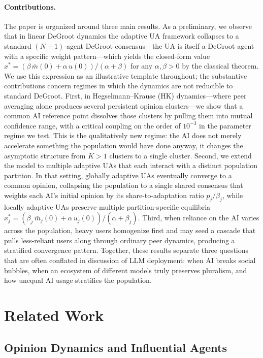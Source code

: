 \documentclass{article}
\theoremstyle{plain}
\theoremstyle{definition}
\theoremstyle{remark}
\newcommand{\mbar}{\bar{m}}
\begin{document}
\paragraph{Contributions.}
The paper is organized around three main results.  As a preliminary,
we observe that in linear DeGroot dynamics the adaptive UA framework
collapses to a standard $(N+1)$-agent DeGroot consensus---the UA is
itself a DeGroot agent with a specific weight pattern---which yields
the closed-form value
$x^*=(\beta\,\mbar(0)+\alpha\,u(0))/(\alpha+\beta)$ for any
$\alpha,\beta>0$ by the classical theorem.  We use this expression as
an illustrative template throughout; the substantive contributions
concern regimes in which the dynamics are not reducible to standard
DeGroot.
First, in Hegselmann--Krause (HK) dynamics---where peer averaging
alone produces several persistent opinion clusters---we show that a
common AI reference point dissolves those clusters by pulling them
into mutual confidence range, with a critical coupling on the order
of $10^{-3}$ in the parameter regime we test.  This is the
qualitatively new regime: the AI does not merely accelerate something
the population would have done anyway, it changes the asymptotic
structure from $K>1$ clusters to a single cluster.
Second, we extend the model to multiple adaptive UAs that each
interact with a distinct population partition.  In that setting,
globally adaptive UAs eventually converge to a common opinion,
collapsing the population to a single shared consensus that weights
each AI's initial opinion by its share-to-adaptation ratio
$p_j/\beta_j$, while locally adaptive UAs preserve multiple
partition-specific equilibria
$x_j^*=(\beta_j\,\mbar_j(0)+\alpha\,u_j(0))/(\alpha+\beta_j)$.
Third, when reliance on the AI varies across the population, heavy
users homogenize first and may seed a cascade that pulls less-reliant
users along through ordinary peer dynamics, producing a stratified
convergence pattern.
Together, these results separate three questions that are often
conflated in discussion of LLM deployment: when AI breaks social
bubbles, when an ecosystem of different models truly preserves
pluralism, and how unequal AI usage stratifies the population.

\section{Related Work}
\label{sec:related}

\subsection{Opinion Dynamics and Influential Agents}
\end{document}
